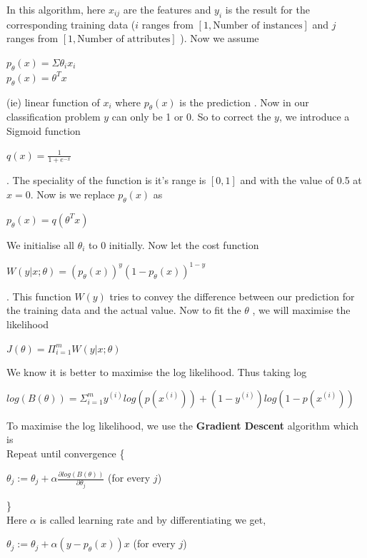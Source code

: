 In this algorithm, here $x_{ij}$ are the features and $y_{i}$  is the result for the corresponding training data ($i$ ranges from $[1,\text{Number of instances}]$ and $j$ ranges from $[1,\text{Number of attributes}]$ ). Now we assume \begin{center} 
 $p_{\theta}(x) = \Sigma \theta_{i}x_{i}$ ~\cite{Stanford} \\ $p_{\theta}(x) = \theta^{T}x $ ~\cite{Stanford}\end{center} (ie) linear function of $x_{i}$ where  $p_{\theta}(x)$ is the prediction . Now in our classification problem $y$ can only be 1 or 0. So to correct the $y$, we introduce a Sigmoid function \begin{center}$q(x) = \frac{1}{1+e^{-x}}$ ~\cite{Stanford}\end{center}. The speciality of the function is it's range is $[0,1]$ and with the value of 0.5 at $x=0$.
 Now is we replace  $p_{\theta}(x)$  as \begin{center}
 $p_{\theta}(x) = q(\theta^{T}x)$~\cite{Stanford}
 \end{center}
 We initialise all $\theta_{i}$ to $0$ initially. Now let the cost function \begin{center}
 $W(y |x;\theta ) = (p_{\theta}(x))^{y}(1-p_{\theta}(x))^{1-y} $ ~\cite{Stanford}
 \end{center}.
	This function $W(y)$ tries to convey the difference between our prediction for the training data and the actual value. Now to fit the $\theta$ , we will maximise the likelihood \begin{center}
	$J(\theta)= \Pi_{i=1}^{m}  W(y |x;\theta) $ ~\cite{Stanford}
	\end{center}
  	We know it is better to maximise the log likelihood. Thus taking log \begin{center}
  	$log(B(\theta)) = \Sigma_{i=1}^{m} y^{(i)}log(p(x^{(i)})) + (1-y^{(i)})log(1-p(x^{(i)}))$
  	\end{center}
   To maximise the log likelihood, we use the \textbf{Gradient Descent} algorithm which is \\
   Repeat until convergence \{  \begin{center}
   $\theta_{j} := \theta_{j} + \alpha \frac{\partial log(B(\theta))}{\partial \theta_{j}}$ (for every $j$) \end{center}
   \} \\
   Here $\alpha$ is called learning rate and by differentiating we get,
   \begin{center}
   $\theta_{j} := \theta_{j} + \alpha ( y-p_{\theta}(x))x$  (for
   every $j$) ~\cite{Stanford}
   \end{center}
